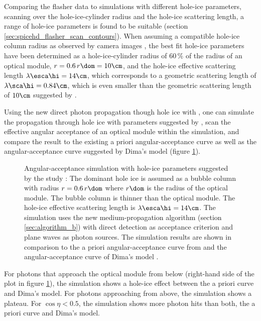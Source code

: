 Comparing the flasher data to simulations with different hole-ice parameters, scanning over the hole-ice-cylinder radius and the hole-ice scattering length, a range of hole-ice parameters is found to be suitable (section \ref{sec:spicehd_flasher_scan_contours}). When assuming a compatible hole-ice column radius as observed by camera images \cite{rongenswedishcamera}, the best fit hole-ice parameters have been determined as a hole-ice-cylinder radius of $60\,\%$ of the radius of an optical module, $r = 0.6\,r\dom = 10\cm$, and the hole-ice effective scattering length $\lambda\esca\hi = 14\cm$, which corresponds to a geometric scattering length of $\lambda\sca\hi = 0.84\cm$, which is even smaller than the geometric scattering length of $10\cm$ suggested by . \cite{martinspicehddard}

Using the new direct photon propagation though hole ice with \clsim, one can simulate the propagation through hole ice with parameters suggested by , scan the effective angular acceptance of an optical module within the simulation, and compare the result to the existing a priori angular-acceptance curve \cite{icepaper} as well as the angular-acceptance curve suggested by Dima's model \cite{flasherdataderivedicemodels} (figure \ref{fig:ku3Zie8z}).

\begin{figure}[htbp]
  \caption{Angular-acceptance simulation with hole-ice parameters suggested by the  study \cite{martinspicehddard}: The dominant hole ice is assumed as a bubble column with radius $r = 0.6\,r\dom$ where $r\dom$ is the radius of the optical module. The bubble column is thinner than the optical module. The hole-ice effective scattering length is $\lambda\esca\hi = 14\cm$. The simulation uses the new medium-propagation algorithm (section \ref{sec:algorithm_b}) with direct detection as acceptance criterion and plane waves as photon sources. The simulation results are shown in comparison to the a priori angular-acceptance curve from \cite{icepaper} and the angular-acceptance curve of Dima's model \cite{flasherdataderivedicemodels}.}
  \label{fig:ku3Zie8z}
\end{figure}


For photons that approach the optical module from below (right-hand side of the plot in figure \ref{fig:ku3Zie8z}), the simulation shows a hole-ice effect between the a priori curve and Dima's model. For photons approaching from above, the simulation shows a plateau. For $\cos\eta < 0.5$, the simulation shows more photon hits than both, the a priori curve and Dima's model.


